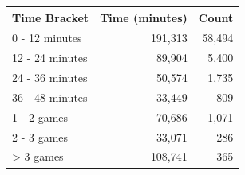 \begin{tabular}{lrr}
\toprule
Time Bracket & Time (minutes) & Count \\
\midrule
0 - 12 minutes  & 191,313 & 58,494 \\
12 - 24 minutes  & 89,904 & 5,400 \\
24 - 36 minutes  & 50,574 & 1,735 \\
36 - 48 minutes  & 33,449 & 809 \\
1 - 2 games & 70,686 & 1,071 \\
2 - 3 games & 33,071 & 286 \\
> 3 games & 108,741 & 365 \\
\bottomrule
\end{tabular}
